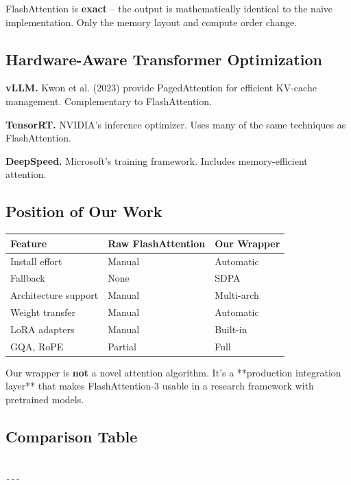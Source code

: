 FlashAttention is \textbf{exact} -- the output is mathematically identical to 
the naive implementation. Only the memory layout and compute order change.

\subsection{Hardware-Aware Transformer Optimization}

\textbf{vLLM.} Kwon et al. (2023) provide PagedAttention for efficient 
KV-cache management. Complementary to FlashAttention.

\textbf{TensorRT.} NVIDIA's inference optimizer. Uses many of the same 
techniques as FlashAttention.

\textbf{DeepSpeed.} Microsoft's training framework. Includes memory-efficient 
attention.

\subsection{Position of Our Work}

\begin{table}[H]
\centering
\small
\begin{tabular}{lll}
\toprule
\textbf{Feature} & \textbf{Raw FlashAttention} & \textbf{Our Wrapper} \\
\midrule
Install effort & Manual & Automatic \\
Fallback & None & SDPA \\
Architecture support & Manual & Multi-arch \\
Weight transfer & Manual & Automatic \\
LoRA adapters & Manual & Built-in \\
GQA, RoPE & Partial & Full \\
\bottomrule
\end{tabular}
\end{table}

Our wrapper is \textbf{not} a novel attention algorithm. It's a **production 
integration layer** that makes FlashAttention-3 usable in a research 
framework with pretrained models.

\subsection{Comparison Table}

\begin{lstlisting}

---
\end{lstlisting}